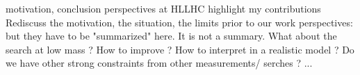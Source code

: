 motivation, conclusion
perspectives at HLLHC
highlight my contributions
Rediscuss the motivation, the situation, the limits prior to our work
perspectives: but they have to be "summarized" here. It is not a summary.
	What about the search at low mass ?
	How to improve ?
	How to interpret in a realistic model ? Do we have other strong constraints from other measurements/ serches ? ...
